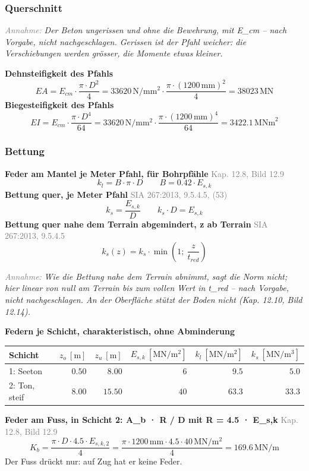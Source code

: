 \documentclass[11pt,a4paper]{article}
\newcommand{\normref}[1]{{\small\textcolor{gray}{#1}}}
\newcommand{\hinweis}[2]{\par\noindent\textcolor{gray}{\textit{#1:}} \textit{#2}\par}
\begin{document}
\subsubsection{Querschnitt}
\hinweis{Annahme}{Der Beton ungerissen und ohne die Bewehrung, mit E\_cm -- nach Vorgabe, nicht nachgeschlagen. Gerissen ist der Pfahl weicher: die Verschiebungen werden grösser, die Momente etwas kleiner.}
\noindent\textbf{Dehnsteifigkeit des Pfahls}
\begin{equation*}
EA = E_{cm} \cdot \frac{\pi \cdot D^{2}}{4} = 33620\,\mathrm{N}/\mathrm{mm}^{2} \cdot \frac{\pi \cdot \left(1200\,\mathrm{mm}\right)^{2}}{4} = 38023\,\mathrm{MN}
\end{equation*}
\noindent\textbf{Biegesteifigkeit des Pfahls}
\begin{equation*}
EI = E_{cm} \cdot \frac{\pi \cdot D^{4}}{64} = 33620\,\mathrm{N}/\mathrm{mm}^{2} \cdot \frac{\pi \cdot \left(1200\,\mathrm{mm}\right)^{4}}{64} = 3422.1\,\mathrm{MNm}^{2}
\end{equation*}
\subsubsection{Bettung}
\noindent\textbf{Feder am Mantel je Meter Pfahl, für Bohrpfähle} \hfill \normref{Kap. 12.8, Bild 12.9}
\begin{equation*}
k_l = B \cdot \pi \cdot D \qquad B = 0.42 \cdot E_{s,k}
\end{equation*}
\noindent\textbf{Bettung quer, je Meter Pfahl} \hfill \normref{SIA 267:2013, 9.5.4.5, (53)}
\begin{equation*}
k_s = \frac{E_{s,k}}{D} \qquad k_s \cdot D = E_{s,k}
\end{equation*}
\noindent\textbf{Bettung quer nahe dem Terrain abgemindert, z ab Terrain} \hfill \normref{SIA 267:2013, 9.5.4.5}
\begin{equation*}
k_s(z) = k_s \cdot \min\left(1;\ \frac{z}{t_{red}}\right)
\end{equation*}
\hinweis{Annahme}{Wie die Bettung nahe dem Terrain abnimmt, sagt die Norm nicht; hier linear von null am Terrain bis zum vollen Wert in t\_red -- nach Vorgabe, nicht nachgeschlagen. An der Oberfläche stützt der Boden nicht (Kap. 12.10, Bild 12.14).}
\noindent\textbf{Federn je Schicht, charakteristisch, ohne Abminderung}
\begin{longtable}{lrrrrr}
\hline
Schicht & $z_o\ [\mathrm{m}]$ & $z_u\ [\mathrm{m}]$ & $E_{s,k}\ [\mathrm{MN/m^2}]$ & $k_l\ [\mathrm{MN/m^2}]$ & $k_s\ [\mathrm{MN/m^3}]$ \\
\hline
\endhead
1: Seeton & $0.50$ & $8.00$ & $6$ & $9.5$ & $5.0$ \\
2: Ton, steif & $8.00$ & $15.50$ & $40$ & $63.3$ & $33.3$ \\
\hline
\end{longtable}
\noindent\textbf{Feder am Fuss, in Schicht 2: A\_b · R / D mit R = 4.5 · E\_s,k} \hfill \normref{Kap. 12.8, Bild 12.9}
\begin{equation*}
K_b = \frac{\pi \cdot D \cdot 4.5 \cdot E_{s,k,2}}{4} = \frac{\pi \cdot 1200\,\mathrm{mm} \cdot 4.5 \cdot 40\,\mathrm{MN}/\mathrm{m}^{2}}{4} = 169.6\,\mathrm{MN}/\mathrm{m}
\end{equation*}
Der Fuss drückt nur: auf Zug hat er keine Feder.
\end{document}
